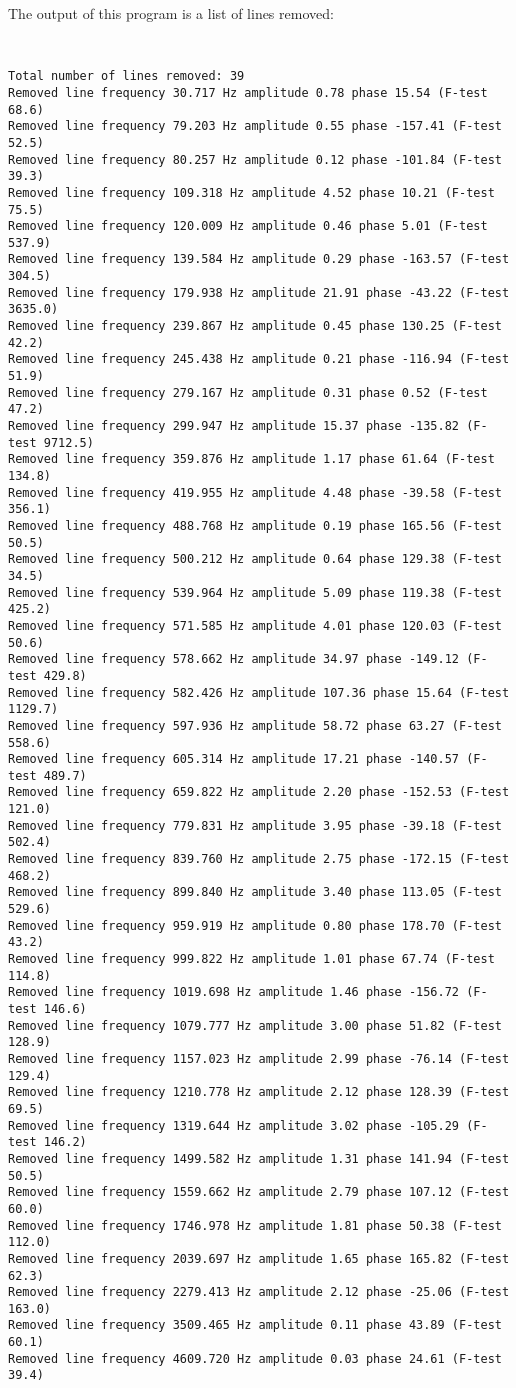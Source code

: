 The output of this program is a list of lines removed:\\
{\tt 
\begin{verbatim}
Total number of lines removed: 39
Removed line frequency 30.717 Hz amplitude 0.78 phase 15.54 (F-test 68.6)
Removed line frequency 79.203 Hz amplitude 0.55 phase -157.41 (F-test 52.5)
Removed line frequency 80.257 Hz amplitude 0.12 phase -101.84 (F-test 39.3)
Removed line frequency 109.318 Hz amplitude 4.52 phase 10.21 (F-test 75.5)
Removed line frequency 120.009 Hz amplitude 0.46 phase 5.01 (F-test 537.9)
Removed line frequency 139.584 Hz amplitude 0.29 phase -163.57 (F-test 304.5)
Removed line frequency 179.938 Hz amplitude 21.91 phase -43.22 (F-test 3635.0)
Removed line frequency 239.867 Hz amplitude 0.45 phase 130.25 (F-test 42.2)
Removed line frequency 245.438 Hz amplitude 0.21 phase -116.94 (F-test 51.9)
Removed line frequency 279.167 Hz amplitude 0.31 phase 0.52 (F-test 47.2)
Removed line frequency 299.947 Hz amplitude 15.37 phase -135.82 (F-test 9712.5)
Removed line frequency 359.876 Hz amplitude 1.17 phase 61.64 (F-test 134.8)
Removed line frequency 419.955 Hz amplitude 4.48 phase -39.58 (F-test 356.1)
Removed line frequency 488.768 Hz amplitude 0.19 phase 165.56 (F-test 50.5)
Removed line frequency 500.212 Hz amplitude 0.64 phase 129.38 (F-test 34.5)
Removed line frequency 539.964 Hz amplitude 5.09 phase 119.38 (F-test 425.2)
Removed line frequency 571.585 Hz amplitude 4.01 phase 120.03 (F-test 50.6)
Removed line frequency 578.662 Hz amplitude 34.97 phase -149.12 (F-test 429.8)
Removed line frequency 582.426 Hz amplitude 107.36 phase 15.64 (F-test 1129.7)
Removed line frequency 597.936 Hz amplitude 58.72 phase 63.27 (F-test 558.6)
Removed line frequency 605.314 Hz amplitude 17.21 phase -140.57 (F-test 489.7)
Removed line frequency 659.822 Hz amplitude 2.20 phase -152.53 (F-test 121.0)
Removed line frequency 779.831 Hz amplitude 3.95 phase -39.18 (F-test 502.4)
Removed line frequency 839.760 Hz amplitude 2.75 phase -172.15 (F-test 468.2)
Removed line frequency 899.840 Hz amplitude 3.40 phase 113.05 (F-test 529.6)
Removed line frequency 959.919 Hz amplitude 0.80 phase 178.70 (F-test 43.2)
Removed line frequency 999.822 Hz amplitude 1.01 phase 67.74 (F-test 114.8)
Removed line frequency 1019.698 Hz amplitude 1.46 phase -156.72 (F-test 146.6)
Removed line frequency 1079.777 Hz amplitude 3.00 phase 51.82 (F-test 128.9)
Removed line frequency 1157.023 Hz amplitude 2.99 phase -76.14 (F-test 129.4)
Removed line frequency 1210.778 Hz amplitude 2.12 phase 128.39 (F-test 69.5)
Removed line frequency 1319.644 Hz amplitude 3.02 phase -105.29 (F-test 146.2)
Removed line frequency 1499.582 Hz amplitude 1.31 phase 141.94 (F-test 50.5)
Removed line frequency 1559.662 Hz amplitude 2.79 phase 107.12 (F-test 60.0)
Removed line frequency 1746.978 Hz amplitude 1.81 phase 50.38 (F-test 112.0)
Removed line frequency 2039.697 Hz amplitude 1.65 phase 165.82 (F-test 62.3)
Removed line frequency 2279.413 Hz amplitude 2.12 phase -25.06 (F-test 163.0)
Removed line frequency 3509.465 Hz amplitude 0.11 phase 43.89 (F-test 60.1)
Removed line frequency 4609.720 Hz amplitude 0.03 phase 24.61 (F-test 39.4)
\end{verbatim}
}
